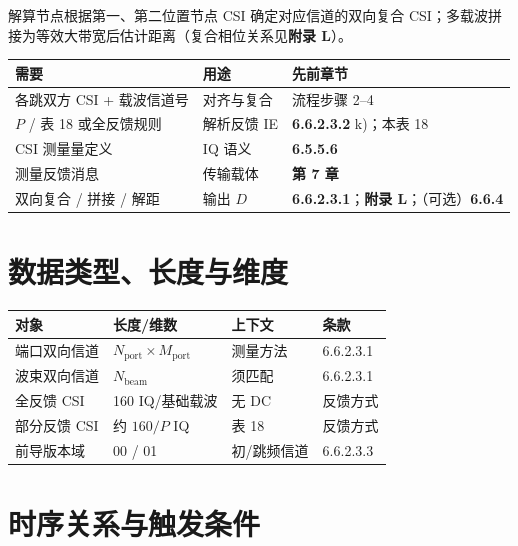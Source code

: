 \documentclass[11pt,a4paper]{ctexart}
\begin{document}
解算节点根据第一、第二位置节点 CSI 确定对应信道的双向复合 CSI；多载波拼接为等效大带宽后估计距离（复合相位关系见\textbf{附录 L}）。

\begin{center}
\small
\begin{tabular}{|L{3.5cm}|L{4.5cm}|L{5cm}|}
\hline
\textbf{需要} & \textbf{用途} & \textbf{先前章节} \\
\hline
各跳双方 CSI + 载波信道号 & 对齐与复合 & 流程步骤 2--4 \\
\hline
$P$ / 表 18 或全反馈规则 & 解析反馈 IE & \textbf{6.6.2.3.2} k)；本表 18 \\
\hline
CSI 测量量定义 & IQ 语义 & \textbf{6.5.5.6} \\
\hline
测量反馈消息 & 传输载体 & \textbf{第 7 章} \\
\hline
双向复合 / 拼接 / 解距 & 输出 $D$ & \textbf{6.6.2.3.1}；\textbf{附录 L}；（可选）\textbf{6.6.4} \\
\hline
\end{tabular}
\end{center}

\section{数据类型、长度与维度}

\begin{table}[h]
\centering
\small
\begin{tabular}{llll}
\toprule
\textbf{对象} & \textbf{长度/维数} & \textbf{上下文} & \textbf{条款} \\
\midrule
端口双向信道 & $N_{\mathrm{port}}\times M_{\mathrm{port}}$ & 测量方法 & 6.6.2.3.1 \\
波束双向信道 & $N_{\mathrm{beam}}$ & 须匹配 & 6.6.2.3.1 \\
全反馈 CSI & 160 IQ/基础载波 & 无 DC & 反馈方式 \\
部分反馈 CSI & 约 $160/P$ IQ & 表 18 & 反馈方式 \\
前导版本域 & 00 / 01 & 初/跳频信道 & 6.6.2.3.3 \\
\bottomrule
\end{tabular}
\end{table}

\section{时序关系与触发条件}
\end{document}
